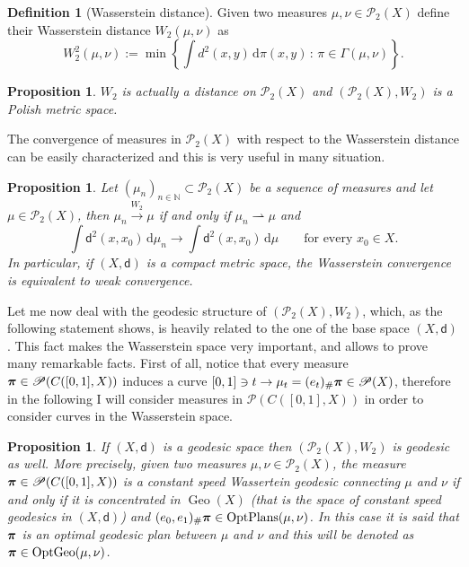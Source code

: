 \documentclass[11pt,twoside,a4paper]{article}
\newcommand{\setN}{\mathbb{N}}
\newcommand{\de}{\ensuremath{\, \mathrm d}} %
\newcommand{\suchthat}{\ensuremath{\,:\,}} %
\newcommand{\weakto}{\rightharpoonup}
\newcommand{\di}{\mathsf d} %
\DeclareMathOperator{\Geo}{Geo}
\DeclareMathOperator{\OptGeo}{OptGeo}
\DeclareMathOperator{\OptPlans}{OptPlans}
\newcommand{\Prob}{\mathscr{P}}
\newcommand{\ProbTwo}{\mathscr{P}_2}
\newcommand{\ppi}{{\mbox{\boldmath$\pi$}}}
\theoremstyle{theorem}
\newtheorem{prop}[theorem]{Proposition}
\theoremstyle{definition}
\newtheorem{definition}[theorem]{Definition}
\theoremstyle{remark}
\theoremstyle{proof}
\begin{document}
\begin{definition}[Wasserstein distance]
Given two measures $\mu,\nu\in \ProbTwo(X)$ define their Wasserstein distance $W_2(\mu,\nu)$ as 
\begin{equation*}
W_2^2(\mu,\nu) := \min \left\{ \int d^2(x,y) \de \pi(x,y) \suchthat \pi \in \Gamma(\mu,\nu) \right \}.
\end{equation*}
\end{definition}

\begin{prop}
 $W_2$ is actually a distance on $\ProbTwo(X)$ and $(\ProbTwo(X),W_2)$ is a Polish metric space.
\end{prop}

\noindent The convergence of measures in $\ProbTwo(X)$ with respect to the Wasserstein distance can be easily characterized and this is very useful in many situation. 

\begin{prop}\label{prop:chrW2covergence}
Let $(\mu_n)_{n\in \setN} \subset \ProbTwo(X)$ be a sequence of measures and let $\mu\in \ProbTwo(X)$, then $ \mu_n \xrightarrow{W_2} \mu $ if and only if $\mu_n \weakto \mu $ and
 \begin{equation*}
  \int \di^2(x,x_0) \de \mu_n \to \int \di^2(x,x_0) \de \mu \qquad \text{for every }x_0\in X.
 \end{equation*}
 In particular, if $(X,\di)$ is a compact metric space, the Wasserstein convergence is equivalent to weak convergence.
\end{prop}

Let me now deal with the geodesic structure of $(\ProbTwo(X),W_2)$, which, as the following statement shows, is heavily related to the one of the base space $(X,\di)$. This fact makes the Wasserstein space very important, and allows to prove many remarkable facts. First of all, notice that every measure $\ppi\in\Prob(C([0,1],X))$ induces a curve $[0,1]\ni t \to \mu_t=(e_t)_\# \ppi \in \Prob(X)$, therefore in the following I will consider measures in $\Prob(C([0,1],X))$ in order to consider curves in the Wasserstein space. 


\begin{prop}\label{prop:optgeo}
If $(X,\di)$ is a geodesic space then $(\ProbTwo(X),W_2)$ is geodesic as well.
More precisely, given two measures $\mu,\nu\in \ProbTwo(X)$, the measure $\ppi\in\Prob(C([0,1],X))$ is a constant speed Wassertein geodesic connecting $\mu$ and $\nu$ if and only if it is concentrated in $\Geo(X)$ (that is the space of constant speed geodesics in $(X,\di)$) and $(e_0,e_1)_\#\ppi\in\OptPlans(\mu,\nu)$. In this case it is said that $\ppi$ is an optimal geodesic plan between $\mu$ and $\nu$ and this will be denoted as $\ppi\in\OptGeo(\mu,\nu)$.
\end{prop}
\end{document}
